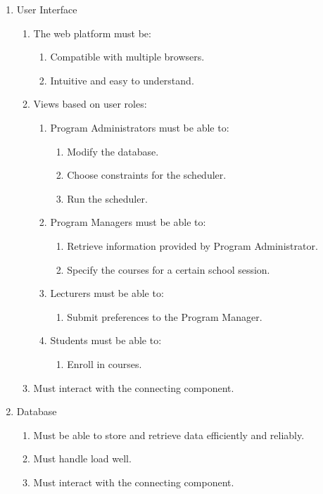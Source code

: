 \documentclass[12pt]{article}
\begin{document}
\begin{enumerate}
\item User Interface
	\begin{enumerate}
	\item The web platform must be:
		\begin{enumerate}
		\item Compatible with multiple browsers.
		\item	Intuitive and easy to understand.
		\end{enumerate}
	\item Views based on user roles:
		\begin{enumerate}
		\item Program Administrators must be able to:
			\begin{enumerate}
		    \item Modify the database.
		    \item Choose constraints for the scheduler.
		    \item Run the scheduler.
		    \end{enumerate}
		\item Program Managers must be able to:
			\begin{enumerate}
		   \item Retrieve information provided by Program Administrator.
		   \item Specify the courses for a certain school session.
		   \end{enumerate}
		\item Lecturers must be able to:
			\begin{enumerate}
			\item Submit preferences to the Program Manager.
			\end{enumerate}
		\item Students must be able to:
			\begin{enumerate}
		   \item Enroll in courses.
		   \end{enumerate}
		\end{enumerate}
	\item Must interact with the connecting component.
	\end{enumerate}
\item Database
	\begin{enumerate}
	\item Must be able to store and retrieve data efficiently and reliably.
	\item Must handle load well.
	\item Must interact with the connecting component.

\end{enumerate}
\end{enumerate}
\end{document}
